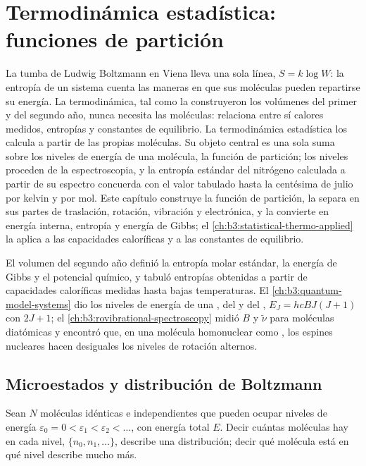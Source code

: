 \chapter{Termodinámica estadística: funciones de partición}\label{ch:b3:partition-functions}

La tumba de Ludwig Boltzmann en Viena lleva una sola línea, $S = k\log W$: la
entropía de un sistema cuenta las maneras en que sus moléculas pueden repartirse su energía.
La termodinámica, tal como la construyeron los volúmenes del primer y del segundo año, nunca necesita
las moléculas: relaciona entre sí calores medidos, entropías y constantes de equilibrio.
La termodinámica estadística los calcula a partir de las propias
moléculas. Su objeto central es una sola suma sobre los niveles de energía de una
molécula, la función de partición; los niveles proceden de la espectroscopia, y la
entropía estándar del nitrógeno calculada a partir de su espectro concuerda con el
valor tabulado hasta la centésima de julio por kelvin y por mol. Este capítulo
construye la función de partición, la separa en sus partes de traslación, rotación,
vibración y electrónica, y la convierte en energía interna, entropía
y energía de Gibbs; el \cref{ch:b3:statistical-thermo-applied} la aplica a las capacidades
caloríficas y a las constantes de equilibrio.

\begin{recall}
El volumen del segundo año definió la entropía molar estándar, la energía de Gibbs y el
potencial químico, y tabuló entropías obtenidas a partir de capacidades caloríficas
medidas hasta bajas temperaturas. El \cref{ch:b3:quantum-model-systems} dio los
niveles de energía de una , del  y del
, $E_J = hcBJ(J+1)$ con  $2J + 1$; el
\cref{ch:b3:rovibrational-spectroscopy} midió $B$ y $\tilde\nu$ para moléculas
diatómicas y encontró que, en una molécula homonuclear como , los
espines nucleares hacen desiguales los niveles de rotación alternos.
\end{recall}

\section{Microestados y distribución de Boltzmann}

Sean $N$ moléculas idénticas e independientes que pueden ocupar niveles de energía
$\varepsilon_0 = 0 < \varepsilon_1 < \varepsilon_2 < \dots$, con energía total $E$. Decir cuántas
moléculas hay en cada nivel, $\{n_0, n_1, \dots\}$, describe una distribución;
decir qué molécula está en qué nivel describe mucho más.

